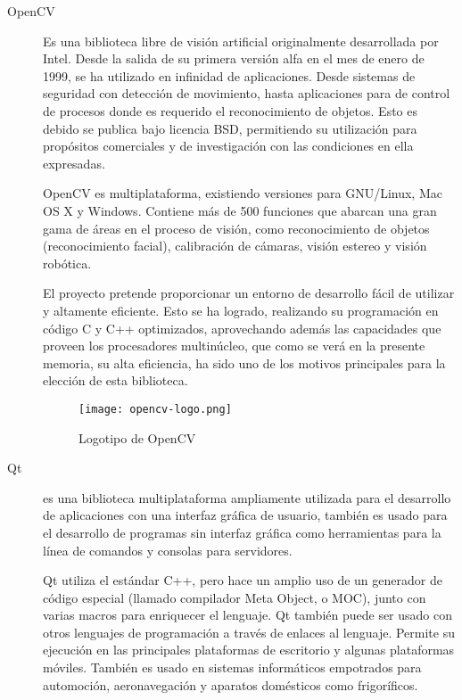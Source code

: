 \begin{description} 

\item [OpenCV]
Es una biblioteca libre de visión artificial originalmente desarrollada por Intel. Desde la salida de su primera versión alfa en el mes de enero de 1999, se ha utilizado en infinidad de aplicaciones. Desde sistemas de seguridad con detección de movimiento, hasta aplicaciones para de control de procesos donde es requerido el reconocimiento de objetos. Esto es debido se publica bajo licencia BSD, permitiendo su utilización para propósitos comerciales y de investigación con las condiciones en ella expresadas.

OpenCV es multiplataforma, existiendo versiones para GNU/Linux, Mac OS X y Windows. Contiene más de 500 funciones que abarcan una gran gama de áreas en el proceso de visión, como reconocimiento de objetos (reconocimiento facial), calibración de cámaras, visión estereo y visión robótica.

El proyecto pretende proporcionar un entorno de desarrollo fácil de utilizar y altamente eficiente. Esto se ha logrado, realizando su programación en código C y C++ optimizados, aprovechando además las capacidades que proveen los procesadores multinúcleo, que como se verá en la presente memoria, su alta eficiencia, ha sido uno de los motivos principales para la elección de esta biblioteca.

\begin{figure}[H]
  \begin{center}
    \texttt{[image: opencv-logo.png]}
  \end{center}
  \caption{Logotipo de OpenCV}
  \label{SRV-1}
\end{figure}

\item [Qt] es una biblioteca multiplataforma ampliamente utilizada para el desarrollo de aplicaciones con una interfaz gráfica de usuario, también es usado para el desarrollo de programas sin interfaz gráfica como herramientas para la línea de comandos y consolas para servidores.

Qt utiliza el estándar C++, pero hace un amplio uso de un generador de código especial (llamado compilador Meta Object, o MOC), junto con varias macros para enriquecer el lenguaje. Qt también puede ser usado con otros lenguajes de programación a través de enlaces al lenguaje. Permite su ejecución en las principales plataformas de escritorio y algunas plataformas móviles. También es usado en sistemas informáticos empotrados para automoción, aeronavegación y aparatos domésticos como frigoríficos.


\end{description}
